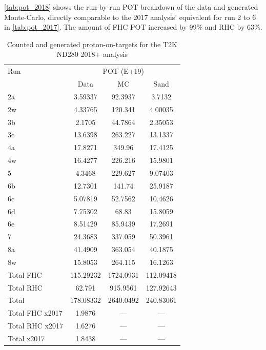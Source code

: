\autoref{tab:pot_2018} shows the run-by-run POT breakdown of the data and generated Monte-Carlo, directly comparable to the 2017 analysis' equivalent for run 2 to 6 in \autoref{tab:pot_2017}. The amount of FHC POT increased by 99\% and RHC by 63\%.
\begin{table}[h]
	\centering
	\begin{tabular}{ l | c c c }
		\hline
		\hline
		Run &  \multicolumn{3}{c}{POT (E+19)} \\
		    & 	Data & MC & Sand \\
		\hline
		2a  & 3.59337    & 92.3937     & 3.7132  \\
		2w  & 4.33765    & 120.341     & 4.00035 \\
		\hline
		3b  & 2.1705     & 44.7864     & 2.35053 \\
		3c  & 13.6398    & 263.227     & 13.1337 \\
		\hline
		4a  & 17.8271    & 349.96      & 17.4125 \\
		4w  & 16.4277    & 226.216     & 15.9801 \\
		\hline
		5   & 4.3468     & 229.627     & 9.07403 \\
		\hline
		6b  & 12.7301    & 141.74      & 25.9187 \\
		6c  & 5.07819    & 52.7562     & 10.4626 \\
		6d  & 7.75302    & 68.83       & 15.8059 \\
		6e  & 8.51429    & 85.9439     & 17.2691 \\
		\hline
		7   & 24.3683	 & 337.059     & 50.3961 \\
		\hline
		8a  & 41.4909	 & 363.054	   & 40.1875 \\
		8w  & 15.8053    & 264.115 	   & 16.1263 \\
		\hline
		Total FHC & 115.29232 & 1724.0931 &  112.09418 \\
		Total RHC & 62.791 	  & 915.9561  &  127.92643 \\
		\hline
		\hline
		Total 	  & 178.08332 & 2640.0492 &  240.83061 \\
		\hline
		\hline
		Total FHC x2017 & 1.9876 & --- & --- \\
		Total RHC x2017 & 1.6276 & --- & --- \\
		Total x2017 	& 1.8438 & --- & --- \\
		\hline
		\hline
	\end{tabular}
	\caption{Counted and generated proton-on-targets for the T2K ND280 2018+ analysis}
	\label{tab:pot_2018}
\end{table}

